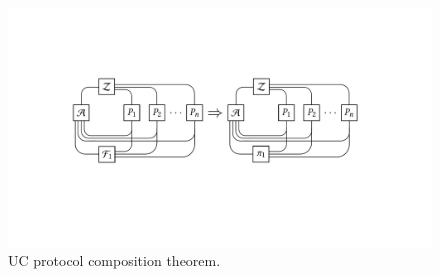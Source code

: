 \begin{figure}
  \centering
  \includegraphics[width=\linewidth]{graphics/composition}
  \caption{UC protocol composition theorem.}
  \label{fig:uc-composition}
\end{figure}
